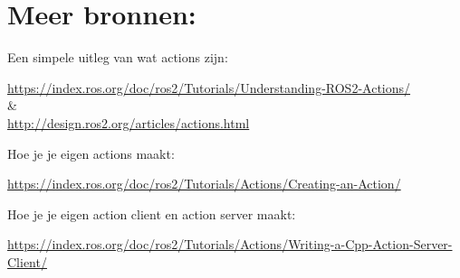 \section{Meer bronnen:}
\label{sec:action_meer_bronnen}
Een simpele uitleg van wat actions zijn:
\begin{center}
    {\footnotesize \url{https://index.ros.org/doc/ros2/Tutorials/Understanding-ROS2-Actions/}} \\
    \& \\
    {\footnotesize \url{http://design.ros2.org/articles/actions.html}}
    
\end{center}
\noindent Hoe je je eigen actions maakt:
\begin{center}
    {\footnotesize \url{https://index.ros.org/doc/ros2/Tutorials/Actions/Creating-an-Action/}}
\end{center}
\noindent Hoe je je eigen action client en action server maakt:
\begin{center}
    {\footnotesize \url{https://index.ros.org/doc/ros2/Tutorials/Actions/Writing-a-Cpp-Action-Server-Client/}}
\end{center}



